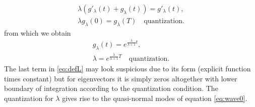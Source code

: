 \documentclass[
a4paper,%
10pt,%
titlepage,%
twoside%
]{article}
\begin{document}
\begin{gather}
  \lambda(g'_\lambda(t)+g_\lambda(t))=g'_\lambda(t),\\
  \lambda g_\lambda(0)=g_\lambda(T)\quad\text{quantization}.
\end{gather}
from which we obtain
\begin{gather}
  g_\lambda(t)=e^{\frac{\lambda}{\lambda+1}t},\\
  \lambda=e^{\frac{\lambda}{\lambda+1}T}\quad\text{quantization}.
\end{gather}
The last term in \eqref{eq:defL} may look suspicious due to its form
(explicit function times constant) but for eigenvectors it is simply
zeros altogether with lower boundary of integration according to the
quantization condition. The quantization for $\lambda$ gives rise to
the quasi-normal modes of equation \eqref{eq:wave0}.
\end{document}

